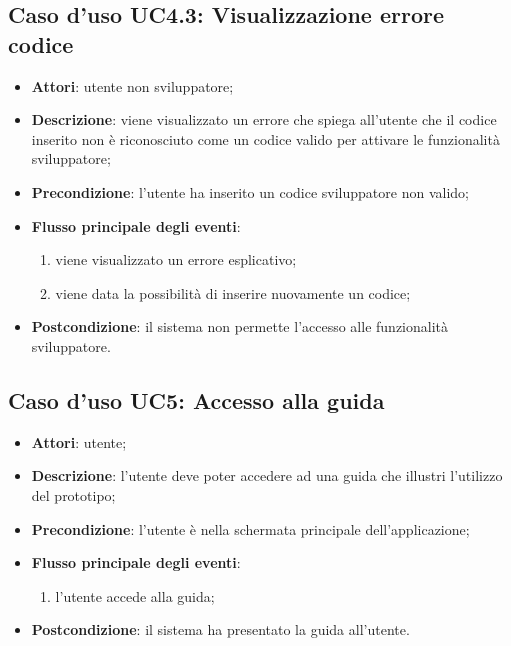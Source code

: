 \documentclass[../AnalisiDeiRequisiti.tex]{subfiles}
\begin{document}
\subsection{Caso d'uso UC4.3: Visualizzazione errore codice}
\begin{itemize}
\item \textbf{Attori}: utente non sviluppatore;
\item \textbf{Descrizione}: viene visualizzato un errore che spiega all'utente che il codice inserito non è riconosciuto come un codice valido per attivare le funzionalità sviluppatore; 
      \item \textbf{Precondizione}: l'utente ha inserito un codice sviluppatore non valido;

        \item \textbf{Flusso principale degli eventi}:
          \begin{enumerate}
          \item viene visualizzato un errore esplicativo;
          \item viene data la possibilità di inserire nuovamente un codice;

      \end{enumerate}
    \item \textbf{Postcondizione}: il sistema non permette l'accesso alle funzionalità sviluppatore.
  \end{itemize}
\hypertarget{UC5}{}
\subsection{Caso d'uso UC5: Accesso alla guida}
\begin{itemize}
\item \textbf{Attori}: utente;
\item \textbf{Descrizione}: l'utente deve poter accedere ad una guida che illustri l'utilizzo del prototipo; 
      \item \textbf{Precondizione}: l'utente è nella schermata principale dell'applicazione;

        \item \textbf{Flusso principale degli eventi}:
          \begin{enumerate}
          \item l'utente accede alla guida;

      \end{enumerate}
    \item \textbf{Postcondizione}: il sistema ha presentato la guida all'utente.
  \end{itemize}
\hypertarget{UC6}{}
\end{document}
